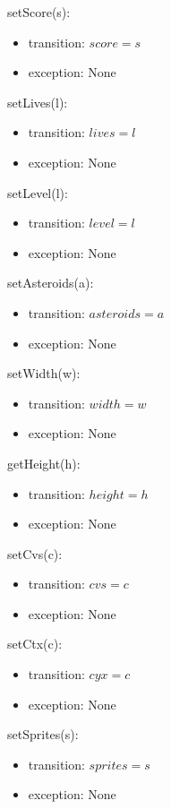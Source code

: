 \documentclass[12pt]{article}
\begin{document}
\noindent setScore(s):
\begin{itemize}
    \item transition: $score = s$
    \item exception: None
\end{itemize}

\noindent setLives(l):
\begin{itemize}
    \item transition: $lives = l$
    \item exception: None
\end{itemize}

\noindent setLevel(l):
\begin{itemize}
    \item transition: $level = l$
    \item exception: None
\end{itemize}

\noindent setAsteroids(a):
\begin{itemize}
    \item transition: $asteroids = a$
    \item exception: None
\end{itemize}

\noindent setWidth(w):
\begin{itemize}
    \item transition: $width = w$
    \item exception: None
\end{itemize}

\noindent getHeight(h):
\begin{itemize}
    \item transition: $height = h$
    \item exception: None
\end{itemize}

\noindent setCvs(c):
\begin{itemize}
    \item transition: $cvs = c$
    \item exception: None
\end{itemize}

\noindent setCtx(c):
\begin{itemize}
    \item transition: $cyx = c$
    \item exception: None
\end{itemize}

\noindent setSprites(s):
\begin{itemize}
    \item transition: $sprites = s$
    \item exception: None
\end{itemize}
\end{document}
